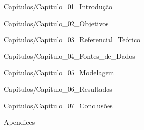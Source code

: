 \documentclass[
	12pt,				%
	a4paper,			%
    openany,            %
    oneside,            %
	english,			%
	spanish,			%
	brazil,				%
	]{abntex2}          %
\begin{document}
\setlength{\cftbeforechapterskip}{0.5em}  %
\tableofcontents*
\cleardoublepage

\textual


 {Capítulos/Capitulo_01_Introdução}

 {Capítulos/Capitulo_02_Objetivos}

 {Capítulos/Capitulo_03_Referencial_Teórico}

 {Capítulos/Capitulo_04_Fontes_de_Dados}

 {Capítulos/Capitulo_05_Modelagem}

 {Capítulos/Capitulo_06_Resultados}

 {Capítulos/Capitulo_07_Conclusões}

\pagebreak



 {Apendices}

\end{document}
